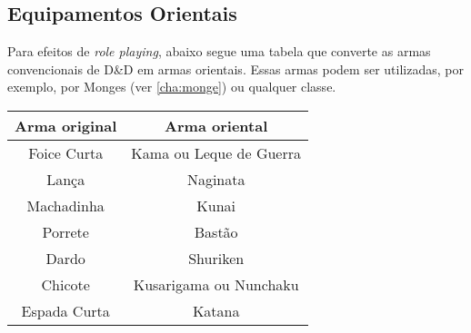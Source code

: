 \begin{multicols}{2}
\section{Equipamentos Orientais}%
\label{sec:equipamentos_orientais}

Para efeitos de \textit{role playing}, abaixo segue uma tabela que converte as
armas convencionais de D\&D em armas orientais. Essas armas podem ser
utilizadas, por exemplo, por Monges (ver \ref{cha:monge}) ou qualquer classe.

\begin{center}
\begin{tabular}{c | c}
\textbf{Arma original} & \textbf{Arma oriental} \\ \hline
Foice Curta & Kama ou Leque de Guerra \\
Lança & Naginata \\
Machadinha & Kunai \\
Porrete & Bastão \\
Dardo & Shuriken \\
Chicote & Kusarigama ou Nunchaku \\
Espada Curta & Katana \\
\end{tabular}
\end{center}

\end{multicols}
